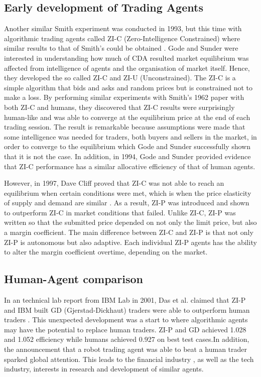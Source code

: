 \subsection{Early development of Trading Agents}
Another similar Smith experiment was conducted in 1993, but this time with algorithmic trading agents called ZI-C (Zero-Intelligence Constrained) where similar results to that of Smith’s could be obtained \cite{godesunder93}. Gode and Sunder were interested in understanding how much of CDA resulted market equilibrium was affected from intelligence of agents and the organisation of market itself. Hence, they developed the so called ZI-C and ZI-U (Unconstrained). The ZI-C is a simple algorithm that bids and asks and random prices but is constrained not to make a loss. By performing similar experiments with Smith’s 1962 \cite{smith1962} paper with both ZI-C and humans, they discovered that ZI-C results were surprisingly human-like and was able to converge at the equilibrium price at the end of each trading session. The result is remarkable because assumptions were made that some intelligence was needed for traders, both buyers and sellers in the market, in order to converge to the equilibrium which Gode and Sunder successfully shown that it is not the case. In addition, in 1994, Gode and Sunder provided evidence that ZI-C performance has a similar allocative efficiency of that of human agents. 

However, in 1997, Dave Cliff proved that ZI-C was not able to reach an equilibrium when certain conditions were met, which is when the price elasticity of supply and demand are similar \cite{zip1997}. As a result, ZI-P was introduced and shown to outperform ZI-C in market conditions that failed. Unlike ZI-C, ZI-P was written so that the submitted price depended on not only the limit price, but also a margin coefficient. The main difference between ZI-C and ZI-P is that not only ZI-P is autonomous but also adaptive. Each individual ZI-P agents has the ability to alter the margin coefficient overtime, depending on the market. 

\subsection{Human-Agent comparison}
In an technical lab report from IBM Lab in 2001, Das et al. claimed that ZI-P and IBM built GD (Gjerstad-Dickhaut) traders were able to outperform human traders \cite{das2001}. This unexpected development was a start to where algorithmic agents may have the potential to replace human traders. ZI-P and GD achieved 1.028 and 1.052 efficiency while humans achieved 0.927 on best test cases.In addition, the announcement that a robot trading agent was able to beat a human trader sparked global attention. This leads to the financial industry , as well as the tech industry, interests in research and development of similar agents. 

